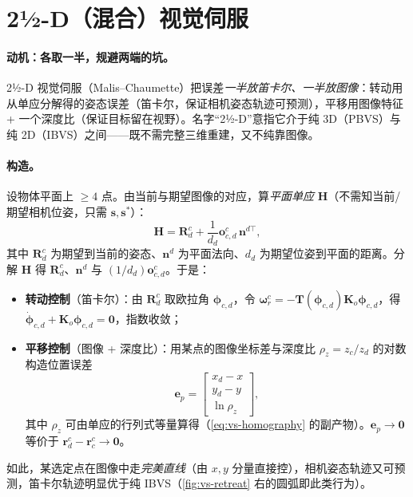 \section{2½-D（混合）视觉伺服}
\label{sec:vs-hybrid}

\paragraph{动机：各取一半，规避两端的坑。}
2½-D 视觉伺服（Malis--Chaumette）把误差\emph{一半放笛卡尔、一半放图像}\cite{malis1999twohalf,siciliano2009robotics}：转动用从单应分解得的姿态误差（笛卡尔，保证相机姿态轨迹可预测），平移用图像特征 + 一个深度比（保证目标留在视野）。名字“2½-D”意指它介于纯 3D（PBVS）与纯 2D（IBVS）之间——既不需完整三维重建，又不纯靠图像。

\paragraph{构造。}
设物体平面上 $\ge4$ 点。由当前与期望图像的对应，算\emph{平面单应} $\mathbf{H}$（不需知当前/期望相机位姿，只需 $\mathbf{s},\mathbf{s}^\ast$）\cite{siciliano2009robotics}：
\begin{equation}
  \mathbf{H}=\mathbf{R}_d^c+\frac{1}{d_d}\mathbf{o}_{c,d}^c\,\mathbf{n}^{d\top},
  \label{eq:vs-homography}
\end{equation}
其中 $\mathbf{R}_d^c$ 为期望到当前的姿态、$\mathbf{n}^d$ 为平面法向、$d_d$ 为期望位姿到平面的距离。分解 $\mathbf{H}$ 得 $\mathbf{R}_d^c$、$\mathbf{n}^d$ 与 $(1/d_d)\mathbf{o}_{c,d}^c$。于是：
\begin{itemize}
  \item \textbf{转动控制}（笛卡尔）：由 $\mathbf{R}_d^c$ 取欧拉角 $\boldsymbol{\phi}_{c,d}$，令 $\boldsymbol{\omega}_r^c=-\mathbf{T}(\boldsymbol{\phi}_{c,d})\mathbf{K}_o\boldsymbol{\phi}_{c,d}$，得 $\dot{\boldsymbol{\phi}}_{c,d}+\mathbf{K}_o\boldsymbol{\phi}_{c,d}=\mathbf{0}$，指数收敛；
  \item \textbf{平移控制}（图像 + 深度比）：用某点的图像坐标差与深度比 $\rho_z=z_c/z_d$ 的对数构造位置误差
  \begin{equation}
    \mathbf{e}_p=\begin{bmatrix}x_d-x\\y_d-y\\\ln\rho_z\end{bmatrix},
    \label{eq:vs-hybrid-ep}
  \end{equation}
  其中 $\rho_z$ 可由单应的行列式等量算得（\cref{eq:vs-homography} 的副产物）。$\mathbf{e}_p\to\mathbf{0}$ 等价于 $\mathbf{r}_d^c-\mathbf{r}_c^c\to\mathbf{0}$。
\end{itemize}
如此，某选定点在图像中走\emph{完美直线}（由 $x,y$ 分量直接控），相机姿态轨迹又可预测，笛卡尔轨迹明显优于纯 IBVS（\cref{fig:vs-retreat} 右的圆弧即此类行为）\cite{siciliano2009robotics}。

